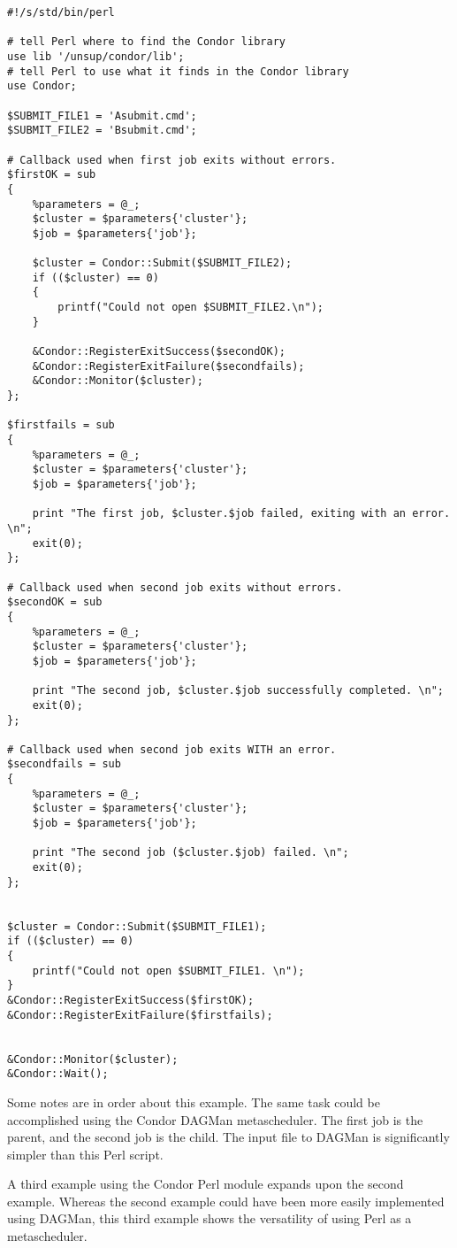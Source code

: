 \begin{verbatim}
#!/s/std/bin/perl

# tell Perl where to find the Condor library
use lib '/unsup/condor/lib';
# tell Perl to use what it finds in the Condor library
use Condor;

$SUBMIT_FILE1 = 'Asubmit.cmd';
$SUBMIT_FILE2 = 'Bsubmit.cmd';

# Callback used when first job exits without errors.
$firstOK = sub
{
    %parameters = @_;
    $cluster = $parameters{'cluster'};
    $job = $parameters{'job'};

    $cluster = Condor::Submit($SUBMIT_FILE2);
    if (($cluster) == 0)
    {
        printf("Could not open $SUBMIT_FILE2.\n");
    }

    &Condor::RegisterExitSuccess($secondOK);
    &Condor::RegisterExitFailure($secondfails);
    &Condor::Monitor($cluster);
};	

$firstfails = sub
{
    %parameters = @_;
    $cluster = $parameters{'cluster'};
    $job = $parameters{'job'};

    print "The first job, $cluster.$job failed, exiting with an error. \n";
    exit(0);
};	

# Callback used when second job exits without errors.
$secondOK = sub
{
    %parameters = @_;
    $cluster = $parameters{'cluster'};
    $job = $parameters{'job'};

    print "The second job, $cluster.$job successfully completed. \n";
    exit(0);
};	

# Callback used when second job exits WITH an error.
$secondfails = sub
{
    %parameters = @_;
    $cluster = $parameters{'cluster'};
    $job = $parameters{'job'};

    print "The second job ($cluster.$job) failed. \n";
    exit(0);
};	


$cluster = Condor::Submit($SUBMIT_FILE1);
if (($cluster) == 0)
{
    printf("Could not open $SUBMIT_FILE1. \n");
}
&Condor::RegisterExitSuccess($firstOK);
&Condor::RegisterExitFailure($firstfails);


&Condor::Monitor($cluster);
&Condor::Wait();
\end{verbatim}

Some notes are in order about this example.
The same task could be accomplished using the Condor DAGMan
metascheduler.
The first job is the parent, and the second job is the child.
The input file to DAGMan is significantly simpler than this
Perl script.

A third example using the Condor Perl module
expands upon the second example.
Whereas the second example could have been more easily
implemented using DAGMan, this third example shows
the versatility of using Perl as a metascheduler.


